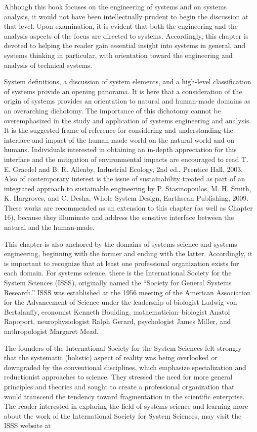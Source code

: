 Although this book focuses on the engineering of systems and on systems analysis, it would not have been intellectually prudent to begin the discussion at that level. Upon examination, it is evident that both the engineering and the analysis aspects of the focus are directed to systems. Accordingly, this chapter is devoted to helping the reader gain essential insight into systems in general, and systems thinking in particular, with orientation toward the engineering and analysis of technical systems.

System definitions, a discussion of system elements, and a high-level classification of systems provide an opening panorama. It is here that a consideration of the origin of systems provides an orientation to natural and human-made domains as an overarching dichotomy. The importance of this dichotomy cannot be overemphasized in the study and application of systems engineering and analysis. It is the suggested frame of reference for considering and understanding the interface and impact of the human-made world on the natural world and on humans. Individuals interested in obtaining an in-depth appreciation for this interface and the mitigation of environmental impacts are encouraged to read T. E. Graedel and B. R. Allenby, Industrial Ecology, 2nd ed., Prentice Hall, 2003. Also of contemporary interest is the issue of sustainability treated as part of an integrated approach to sustainable engineering by P. Stasinopoulos, M. H. Smith, K. Hargroves, and C. Desha, Whole System Design, Earthscan Publishing, 2009. These works are recommended as an extension to this chapter (as well as Chapter 16), because they illuminate and address the sensitive interface between the natural and the human-made.

This chapter is also anchored by the domains of systems science and systems engineering, beginning with the former and ending with the latter. Accordingly, it is important to recognize that at least one professional organization exists for each domain. For systems science, there is the International Society for the System Sciences (ISSS), originally named the “Society for General Systems Research.” ISSS was established at the 1956 meeting of the American Association for the Advancement of Science under the leadership of biologist Ludwig von Bertalanffy, economist Kenneth Boulding, mathematician–biologist Anatol Rapoport, neurophysiologist Ralph Gerard, psychologist James Miller, and anthropologist Margaret Mead.

The founders of the International Society for the System Sciences felt strongly that the systematic (holistic) aspect of reality was being overlooked or downgraded by the conventional disciplines, which emphasize specialization and reductionist approaches to science. They stressed the need for more general principles and theories and sought to create a professional organization that would transcend the tendency toward fragmentation in the scientific enterprise. The reader interested in exploring the field of systems science and learning more about the work of the International Society for System Sciences, may visit the ISSS website at

